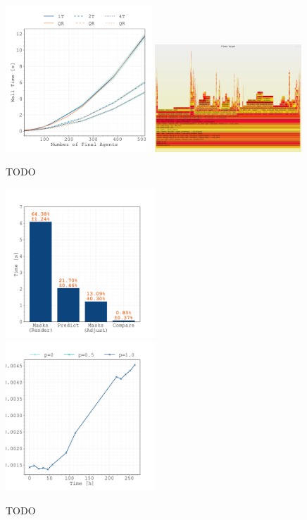 \documentclass{article}
\begin{document}
\begin{figure}[H]
    \centering
    \includegraphics[width=0.49\textwidth]
        {docs/source/_static/performance/computation-time-with-initial-agents.pdf}
    \includegraphics[width=0.49\textwidth]{docs/source/_static/performance/flamegraph.pdf}
    \caption{TODO}
    \label{fig:performance}
\end{figure}

\begin{figure}[H]
    \centering
    \includegraphics[width=0.5\textwidth]{figures/crm_divide/timings.pdf}%
    \includegraphics[width=0.5\textwidth]{figures/crm_divide/time-evolution.pdf}%
    \caption{TODO}
    \label{fig:timings-crm_divide}
\end{figure}
\end{document}
